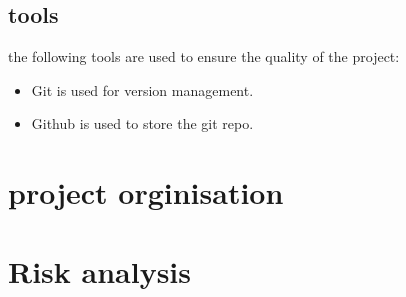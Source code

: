 \documentclass{article} %
\begin{document}
\subsection{tools}
the following tools are used to ensure the quality of the project:
\begin{itemize}
    \item Git is used for version management.
    \item Github is used to store the git repo.
\end{itemize}
\newpage

\section{project orginisation}
\newpage

\section{Risk analysis}
\newpage
\end{document}
